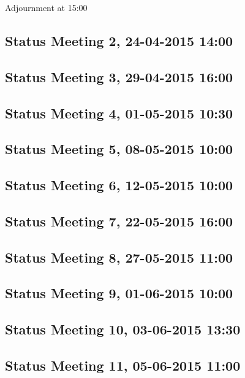 Adjournment at 15:00

\subsection{Status Meeting 2, 24-04-2015 14:00}


\subsection{Status Meeting 3, 29-04-2015 16:00}


\subsection{Status Meeting 4, 01-05-2015 10:30}


\subsection{Status Meeting 5, 08-05-2015 10:00}


\subsection{Status Meeting 6, 12-05-2015 10:00}


\subsection{Status Meeting 7, 22-05-2015 16:00}


\subsection{Status Meeting 8, 27-05-2015 11:00}


\subsection{Status Meeting 9, 01-06-2015 10:00}


\subsection{Status Meeting 10, 03-06-2015 13:30}


\subsection{Status Meeting 11, 05-06-2015 11:00}
